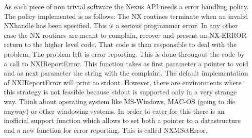 \documentclass[12pt]{article}
\begin{document}
As each piece of non trivial software the Nexus API needs a error handling
policy. The policy implemented is as follows: The NX routines terminate when
an invalid NXhandle has been specified. This is a serious programmer error.
In any other case the NX routines are meant to complain, recover and present
an NX-ERROR return to the higher level code. That code is than responsible
to deal with the problem. The problem left is error reporting. This is done
througout the code by a call to NXIReportError. This function takes as first
parameter a pointer to void and as next parameter the string with the
complaint. The default implementation of NXIReportError will print to
stdout. However, there are environments where this strategy is not feasible
because stdout is supported only in a very  strange way. Think about
operating system like MS-Windows, MAC-OS (going to die anyway) or other
windowing systems. In order to cater for this there is an inofficial support
function which allows to set both a pointer to a datastructure and a new
function for error reporting. This is called NXMSetError.
\end{document}
